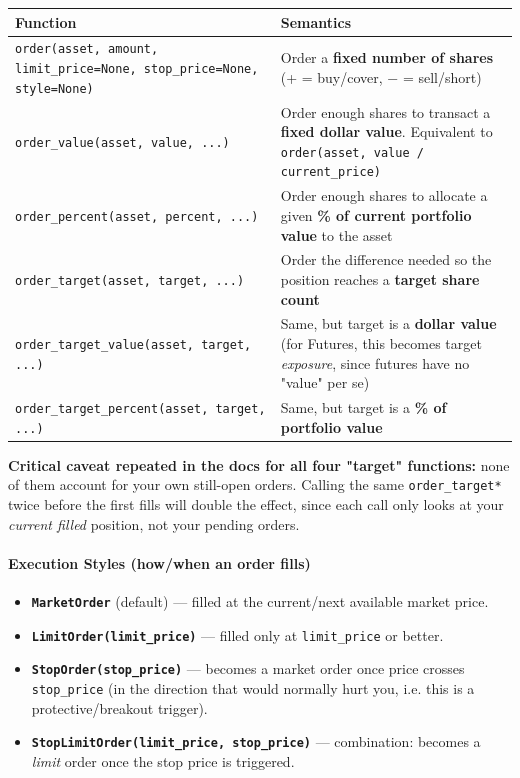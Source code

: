 \documentclass[12pt,openany]{book}
\theoremstyle{definition}
\theoremstyle{remark}
\begin{document}
\begin{longtable}{@{}L{0.46\textwidth}L{0.46\textwidth}@{}}
\toprule
\textbf{Function} & \textbf{Semantics} \\
\midrule
\texttt{order(asset, amount, limit\_price=None, stop\_price=None, style=None)} & Order a \textbf{fixed number of shares} (+ = buy/cover, − = sell/short) \\
\texttt{order\_value(asset, value, ...)} & Order enough shares to transact a \textbf{fixed dollar value}. Equivalent to \texttt{order(asset, value / current\_price)} \\
\texttt{order\_percent(asset, percent, ...)} & Order enough shares to allocate a given \textbf{\% of current portfolio value} to the asset \\
\texttt{order\_target(asset, target, ...)} & Order the difference needed so the position reaches a \textbf{target share count} \\
\texttt{order\_target\_value(asset, target, ...)} & Same, but target is a \textbf{dollar value} (for Futures, this becomes target \emph{exposure}, since futures have no "value" per se) \\
\texttt{order\_target\_percent(asset, target, ...)} & Same, but target is a \textbf{\% of portfolio value} \\
\bottomrule
\end{longtable}

\textbf{Critical caveat repeated in the docs for all four "target" functions:} none of them account for your own still-open orders. Calling the same \texttt{order\_target*} twice before the first fills will double the effect, since each call only looks at your \emph{current filled} position, not your pending orders.

\paragraph{Execution Styles (how/when an order fills)}

\begin{itemize}
\item 
\textbf{\texttt{MarketOrder}} (default) — filled at the current/next available market price.

\item 
\textbf{\texttt{LimitOrder(limit\_price)}} — filled only at \texttt{limit\_price} or better.

\item 
\textbf{\texttt{StopOrder(stop\_price)}} — becomes a market order once price crosses \texttt{stop\_price} (in the direction that would normally hurt you, i.e. this is a protective/breakout trigger).

\item 
\textbf{\texttt{StopLimitOrder(limit\_price, stop\_price)}} — combination: becomes a \emph{limit} order once the stop price is triggered.

\end{itemize}
\end{document}
